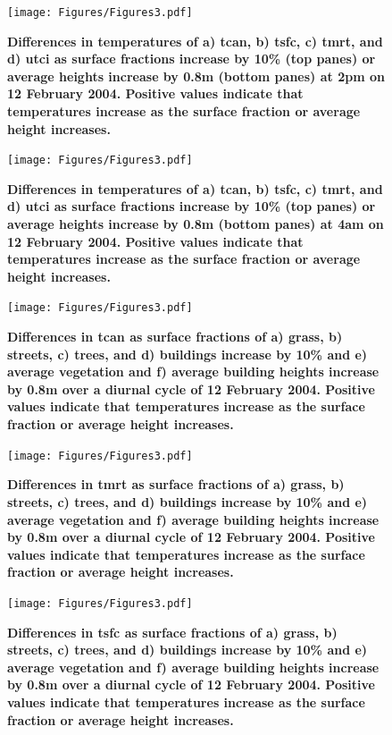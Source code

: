 \documentclass[final,3p,times,authoryear]{elsarticle}
\begin{document}
\begin{figure}
\centering
\texttt{[image: Figures/Figures3.pdf]}
\caption{\bf Differences in temperatures of a) \gls{tcan}, b) \gls{tsfc}, c) \gls{tmrt}, and d) \gls{utci} as surface fractions increase by 10\% (top panes) or average heights increase by 0.8m (bottom panes) at 2pm on 12 February 2004. Positive values indicate that temperatures increase as the surface fraction or average height increases.}
 \label{fig:diff2pm}
\end{figure}

\begin{figure}
\centering
\texttt{[image: Figures/Figures3.pdf]}
\caption{\bf Differences in temperatures of a) \gls{tcan}, b) \gls{tsfc}, c) \gls{tmrt}, and d) \gls{utci} as surface fractions increase by 10\% (top panes) or average heights increase by 0.8m (bottom panes) at 4am on 12 February 2004. Positive values indicate that temperatures increase as the surface fraction or average height increases.}
 \label{fig:diff4am}
\end{figure}


\begin{figure}
\centering
\texttt{[image: Figures/Figures3.pdf]}
\caption{\bf Differences in \gls{tcan} as surface fractions of a) grass, b) streets, c) trees, and d) buildings increase by 10\% and e) average vegetation and f) average building heights increase by 0.8m over a diurnal cycle of 12 February 2004. Positive values indicate that temperatures increase as the surface fraction or average height increases. }
 \label{fig:r2parameterstcan}
\end{figure}

\begin{figure}
\centering
\texttt{[image: Figures/Figures3.pdf]}
\caption{\bf Differences in \gls{tmrt} as surface fractions of a) grass, b) streets, c) trees, and d) buildings increase by 10\% and e) average vegetation and f) average building heights increase by 0.8m over a diurnal cycle of 12 February 2004. Positive values indicate that temperatures increase as the surface fraction or average height increases. }
 \label{fig:r2parameterstmrt}
\end{figure}

\begin{figure}
\centering
\texttt{[image: Figures/Figures3.pdf]}
\caption{\bf Differences in \gls{tsfc} as surface fractions of a) grass, b) streets, c) trees, and d) buildings increase by 10\% and e) average vegetation and f) average building heights increase by 0.8m over a diurnal cycle of 12 February 2004. Positive values indicate that temperatures increase as the surface fraction or average height increases. }
 \label{fig:r2parameterstsfc}
\end{figure}
\end{document}
